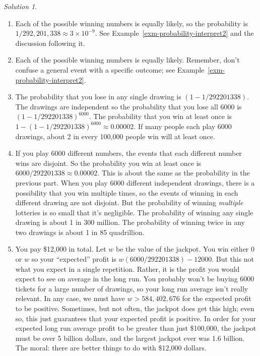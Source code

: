 \documentclass[
  letterpaper,
  DIV=11,
  numbers=noendperiod]{scrreprt}
\providecommand{\tightlist}{%
  \setlength{\itemsep}{0pt}\setlength{\parskip}{0pt}}
\theoremstyle{plain}
\theoremstyle{definition}
\theoremstyle{definition}
\theoremstyle{definition}
\theoremstyle{remark}
\newtheorem{refsolution}{Solution}[chapter]
\begin{document}
\begin{tcolorbox}[enhanced jigsaw, opacityback=0, rightrule=.15mm, coltitle=black, colframe=quarto-callout-tip-color-frame, toprule=.15mm, colbacktitle=quarto-callout-tip-color!10!white, opacitybacktitle=0.6, left=2mm, toptitle=1mm, breakable, title={Solution (click to expand)}, bottomtitle=1mm, colback=white, leftrule=.75mm, titlerule=0mm, arc=.35mm, bottomrule=.15mm]

\begin{refsolution}
\leavevmode

\begin{enumerate}
\def\labelenumi{\arabic{enumi}.}
\tightlist
\item
  Each of the possible winning numbers is equally likely, so the
  probability is \(1/292,201,338\approx 3\times 10^{-9}\). See
  Example~\ref{exm-probability-interpret2} and the discussion following
  it.
\item
  Each of the possible winning numbers is equally likely. Remember,
  don't confuse a general event with a specific outcome; see
  Example~\ref{exm-probability-interpret2}.
\item
  The probability that you lose in any single drawing is
  \((1-1/292201338)\). The drawings are independent so the probability
  that you lose all 6000 is \((1-1/292201338)^{6000}\). The probability
  that you win at least once is
  \(1 - (1-1/292201338)^{6000}\approx 0.00002\). If many people each
  play 6000 drawings, about 2 in every 100,000 people win will at least
  once.
\item
  If you play 6000 different numbers, the events that each different
  number wins are disjoint. So the probability you win at least once is
  \(6000/292201338\approx 0.00002\). This is about the same as the
  probability in the previous part. When you play 6000 different
  independent drawings, there is a possibility that you win multiple
  times, so the events of winning in each different drawing are not
  disjoint. But the probability of winning \emph{multiple} lotteries is
  so small that it's negligible. The probability of winning any single
  drawing is about 1 in 300 million. The probability of winning twice in
  any two drawings is about 1 in 85 quadrillion.
\item
  You pay \$12,000 in total. Let \(w\) be the value of the jackpot. You
  win either 0 or \(w\) so your ``expected'' profit is
  \(w(6000/292201338)-12000\). But this not what you expect in a single
  repetition. Rather, it is the profit you would expect to see on
  average in the long run. You probably won't be buying 6000 tickets for
  a large number of drawings, so your long run average isn't really
  relevant. In any case, we must have \(w>584,402,676\) for the expected
  profit to be positive. Sometimes, but not often, the jackpot does get
  this high; even so, this just guarantees that your expected profit is
  positive. In order for your expected long run average profit to be
  greater than just \$100,000, the jackpot must be over 5 billion
  dollars, and the largest jackpot ever was 1.6 billion. The moral:
  there are better things to do with \$12,000 dollars.
\end{enumerate}


\end{refsolution}
\end{tcolorbox}
\end{document}
